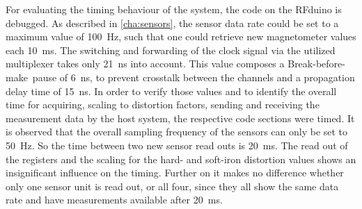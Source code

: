 For evaluating the timing behaviour of the system, the code on the RFduino is debugged. As described in \ref{cha:sensors}, the sensor data rate could be set to a maximum value of \SI{100}{\Hz}, such that one could retrieve new magnetometer values each \SI{10}{\milli \second}. The switching and forwarding of the clock signal via the utilized multiplexer takes only \SI{21}{\nano \second} into account. This value composes a \grqq Break-before-make\grqq \, pause of \SI{6}{\nano \second}, to prevent crosstalk between the channels and a propagation delay time of \SI{15}{\nano \second}. In order to verify those values and to identify the overall time for acquiring, scaling to distortion factors, sending and receiving the measurement data by the host system, the respective code sections were timed. It is observed that the overall sampling frequency of the sensors can only be set to \SI{50}{\Hz}. So the time between two new sensor read outs is \SI{20}{\milli \second}. The read out of the registers and the scaling for the hard- and soft-iron distortion values shows an insignificant influence on the timing. Further on it makes no difference whether only one sensor unit is read out, or all four, since they all show the same data rate and have measurements available after \SI{20}{\milli \second}. 
